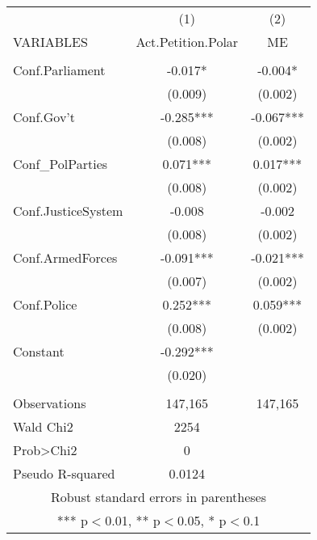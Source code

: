 \documentclass[]{article}
\begin{document}
\begin{tabular}{lcc} \hline
 & (1) & (2) \\
VARIABLES & Act.Petition.Polar & ME \\ \hline
 &  &  \\
Conf.Parliament & -0.017* & -0.004* \\
 & (0.009) & (0.002) \\
Conf.Gov't & -0.285*** & -0.067*** \\
 & (0.008) & (0.002) \\
Conf\_PolParties & 0.071*** & 0.017*** \\
 & (0.008) & (0.002) \\
Conf.JusticeSystem & -0.008 & -0.002 \\
 & (0.008) & (0.002) \\
Conf.ArmedForces & -0.091*** & -0.021*** \\
 & (0.007) & (0.002) \\
Conf.Police & 0.252*** & 0.059*** \\
 & (0.008) & (0.002) \\
Constant & -0.292*** &  \\
 & (0.020) &  \\
 &  &  \\
Observations & 147,165 & 147,165 \\
Wald Chi2 & 2254 &  \\
Prob>Chi2 & 0 &  \\
 Pseudo R-squared & 0.0124 &  \\ \hline
\multicolumn{3}{c}{ Robust standard errors in parentheses} \\
\multicolumn{3}{c}{ *** p$<$0.01, ** p$<$0.05, * p$<$0.1} \\
\end{tabular}
\end{document}

